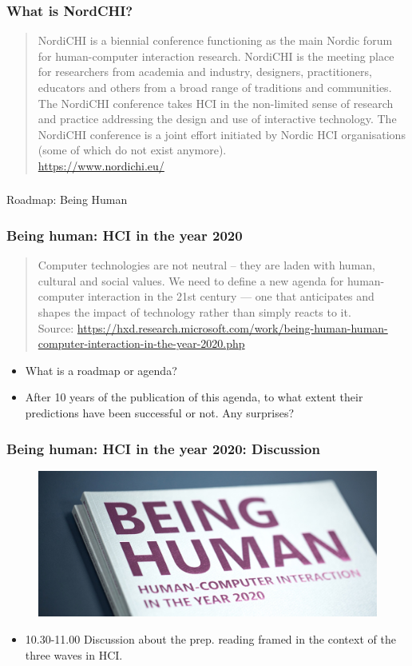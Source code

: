 \documentclass[screen, aspectratio=169]{beamer}
\begin{document}
%
\begin{frame}
\frametitle{What is NordCHI?}
\begin{quote}
NordiCHI is a biennial conference functioning as the main Nordic forum for human-computer interaction research. NordiCHI is the meeting place for researchers from academia and industry, designers, practitioners, educators and others from a broad range of traditions and communities. The NordiCHI conference takes HCI in the non-limited sense of research and practice addressing the design and use of interactive technology. The NordiCHI conference is a joint effort initiated by Nordic HCI organisations (some of which do not exist anymore).  \\
\url{https://www.nordichi.eu/}
\end{quote}
\end{frame}
%
\begin{frame}
\frametitle{}
\Huge{Roadmap: Being Human}
\end{frame}
%
\begin{frame}
\frametitle{Being human: HCI in the year 2020}
\begin{quote}Computer technologies are not neutral -- they are laden with human, cultural and social values.  We need to define a new agenda for human-computer interaction in the 21st century --- one that anticipates and shapes the impact of technology rather than simply reacts to it. \\
{\scriptsize Source: \url{https://hxd.research.microsoft.com/work/being-human-human-computer-interaction-in-the-year-2020.php} }
\end{quote}
\begin{itemize}
\item What is a roadmap or agenda?
\item After 10 years of the publication of this agenda, to what extent their predictions have been successful or not. Any surprises?
\end{itemize}
\end{frame}
%
\begin{frame}
\frametitle{Being human: HCI in the year 2020: Discussion}
 \begin{figure}
	\includegraphics[scale=0.12]{img/being-human.jpg}
    \end{figure}	
\begin{itemize}
\item 10.30-11.00 Discussion about the prep. reading framed in the context of the three waves in HCI.
\end{itemize}
\end{frame}
\end{document}
